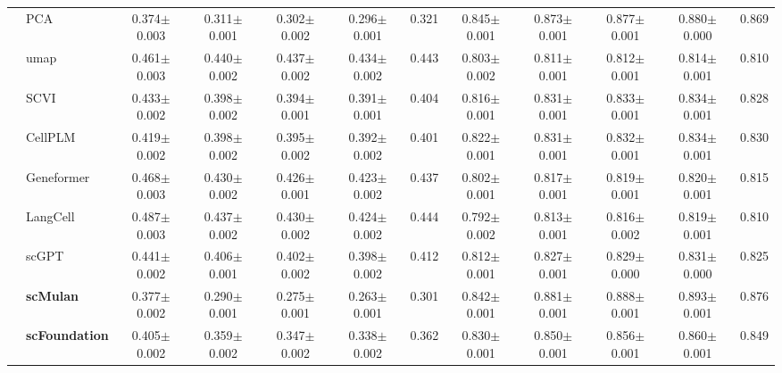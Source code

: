 \begin{table}[htbp]
\begin{tabular}{cl|ccccc|ccccc}
    & PCA      & \cellcolor{gray!25}0.374$\pm$0.003 & 0.311$\pm$0.001 & 0.302$\pm$0.002 & 0.296$\pm$0.001 & 0.321      & \cellcolor{gray!25}0.845$\pm$0.001 & 0.873$\pm$0.001 & 0.877$\pm$0.001 & 0.880$\pm$0.000 & 0.869 \\
    & umap      & 0.461$\pm$0.003 & 0.440$\pm$0.002 & 0.437$\pm$0.002 & 0.434$\pm$0.002 & 0.443      & 0.803$\pm$0.002 & 0.811$\pm$0.001 & 0.812$\pm$0.001 & 0.814$\pm$0.001 & 0.810 \\
    & SCVI      & 0.433$\pm$0.002 & 0.398$\pm$0.002 & 0.394$\pm$0.001 & 0.391$\pm$0.001 & 0.404      & 0.816$\pm$0.001 & 0.831$\pm$0.001 & 0.833$\pm$0.001 & 0.834$\pm$0.001 & 0.828 \\
    & CellPLM      & 0.419$\pm$0.002 & 0.398$\pm$0.002 & 0.395$\pm$0.002 & 0.392$\pm$0.002 & 0.401      & 0.822$\pm$0.001 & 0.831$\pm$0.001 & 0.832$\pm$0.001 & 0.834$\pm$0.001 & 0.830 \\
    & Geneformer      & 0.468$\pm$0.003 & 0.430$\pm$0.002 & 0.426$\pm$0.001 & 0.423$\pm$0.002 & 0.437      & 0.802$\pm$0.001 & 0.817$\pm$0.001 & 0.819$\pm$0.001 & 0.820$\pm$0.001 & 0.815 \\
    & LangCell      & 0.487$\pm$0.003 & 0.437$\pm$0.002 & 0.430$\pm$0.002 & 0.424$\pm$0.002 & 0.444      & 0.792$\pm$0.002 & 0.813$\pm$0.001 & 0.816$\pm$0.002 & 0.819$\pm$0.001 & 0.810 \\
    & scGPT      & 0.441$\pm$0.002 & 0.406$\pm$0.001 & 0.402$\pm$0.002 & 0.398$\pm$0.002 & 0.412      & 0.812$\pm$0.001 & 0.827$\pm$0.001 & 0.829$\pm$0.000 & 0.831$\pm$0.000 & 0.825 \\
    & \cellcolor{gray!25}\textbf{scMulan}      & 0.377$\pm$0.002 & \cellcolor{gray!25}0.290$\pm$0.001 & \cellcolor{gray!25}0.275$\pm$0.001 & \cellcolor{gray!25}0.263$\pm$0.001 & \cellcolor{gray!25}0.301      & 0.842$\pm$0.001 & \cellcolor{gray!25}0.881$\pm$0.001 & \cellcolor{gray!25}0.888$\pm$0.001 & \cellcolor{gray!25}0.893$\pm$0.001 & \cellcolor{gray!25}0.876 \\
    & \cellcolor{gray!25}\textbf{scFoundation}      & 0.405$\pm$0.002 & 0.359$\pm$0.002 & 0.347$\pm$0.002 & 0.338$\pm$0.002 & 0.362      & 0.830$\pm$0.001 & 0.850$\pm$0.001 & 0.856$\pm$0.001 & 0.860$\pm$0.001 & 0.849 \\
    \midrule

    \bottomrule
  \end{tabular}
\end{table}